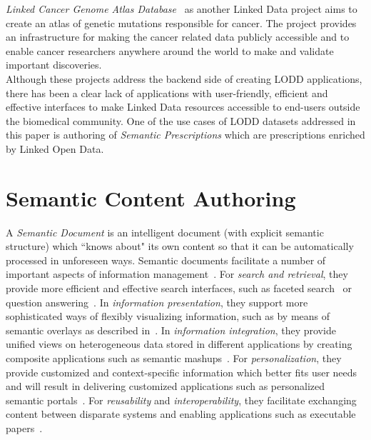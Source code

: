 \documentclass[journal]{IEEEtran}
\begin{document}
\emph{Linked Cancer Genome Atlas Database}~\cite{SAL13} as another Linked Data project aims to create an atlas of genetic mutations responsible for cancer.
The project provides an infrastructure for making the cancer related data publicly accessible and to enable cancer researchers anywhere around the world to make and validate important discoveries.\\

Although these projects address the backend side of creating LODD applications, there has been a clear lack of applications with user-friendly, efficient and effective interfaces to make Linked Data resources accessible to end-users outside the biomedical community.
One of the use cases of LODD datasets addressed in this paper is authoring of \emph{Semantic Prescriptions} which are prescriptions enriched by Linked Open Data.

\section{Semantic Content Authoring}
\label{sec:sca}

A \emph{Semantic Document} is an intelligent document (with explicit semantic structure) which ``knows about" its own content so that it can be automatically processed in unforeseen ways.
Semantic documents facilitate a number of important aspects of information management~\cite{rdface}.
For \emph{search and retrieval}, they provide more efficient and effective search interfaces, such as faceted search~\cite{tunkenlang2009faceted} or question answering~\cite{Lopez2011}.
In \emph{information presentation}, they support more sophisticated ways of flexibly visualizing information, such as by means of semantic overlays as described in~\cite{Burel2009}.
In \emph{information integration}, they provide unified views on heterogeneous data stored in different applications by creating composite applications such as semantic mashups~\cite{Ankolekar2007}.
For \emph{personalization}, they provide customized and context-specific information which better fits user needs and will
result in delivering customized applications such as personalized semantic portals~\cite{ecs2007}.
For \emph{reusability} and \emph{interoperability}, they facilitate exchanging content between disparate systems and enabling applications such as executable papers~\cite{Muller2011}.
\end{document}
